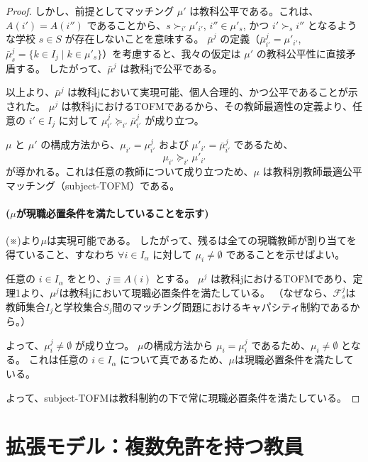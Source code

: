 \documentclass[12pt, a4paper]{article}
\theoremstyle{definition}
\theoremstyle{remark}
\theoremstyle{plain}
\begin{document}
\begin{proof}
しかし、前提としてマッチング $\mu'$ は教科公平である。これは、$A(i')=A(i'')$ であることから、$s \succ_{i'} \mu'_{i'}$, $i'' \in \mu'_s$, かつ $i' \succ_s i''$ となるような学校 $s \in S$ が存在しないことを意味する。
$\bar{\mu}^j$ の定義（$\bar{\mu}^j_{i'} = \mu'_{i'}$, $\bar{\mu}^j_s = \{k \in I_j \mid k \in \mu'_s\}$）を考慮すると、我々の仮定は $\mu'$ の教科公平性に直接矛盾する。
したがって、$\bar{\mu}^j$ は教科jで公平である。

\vspace{\baselineskip}

以上より、$\bar{\mu}^j$ は教科jにおいて実現可能、個人合理的、かつ公平であることが示された。
$\mu^j$ は教科jにおけるTOFMであるから、その教師最適性の定義より、任意の $i' \in I_j$ に対して $\mu^j_{i'} \succeq_{i'} \bar{\mu}^j_{i'}$ が成り立つ。

$\mu$ と $\mu'$ の構成方法から、$\mu_{i'} = \mu^j_{i'}$ および $\mu'_{i'} = \bar{\mu}^j_{i'}$ であるため、
\[
 \mu_{i'} \succeq_{i'} \mu'_{i'}
\]
が導かれる。これは任意の教師について成り立つため、$\mu$ は教科別教師最適公平マッチング（subject-TOFM）である。

\paragraph{($\mu$が現職必置条件を満たしていることを示す)}
(※)より$\mu$は実現可能である。
したがって、残るは全ての現職教師が割り当てを得ていること、すなわち $\forall i \in I_\alpha$ に対して $\mu_i \neq \emptyset$ であることを示せばよい。

任意の $i \in I_\alpha$ をとり、$j \equiv A(i)$ とする。
$\mu^j$ は教科jにおけるTOFMであり、定理1より、$\mu^j$は教科jにおいて現職必置条件を満たしている。
（なぜなら、$\mathcal{F}^j_s$は教師集合$I_j$と学校集合$S_j$間のマッチング問題におけるキャパシティ制約であるから。）

よって、$\mu^j_i \neq \emptyset$ が成り立つ。
$\mu$の構成方法から $\mu_i = \mu^j_i$ であるため、$\mu_i \neq \emptyset$ となる。
これは任意の $i \in I_\alpha$ について真であるため、$\mu$は現職必置条件を満たしている。

よって、subject-TOFMは教科制約の下で常に現職必置条件を満たしている。


\end{proof}




\section{拡張モデル：複数免許を持つ教員}
\end{document}
